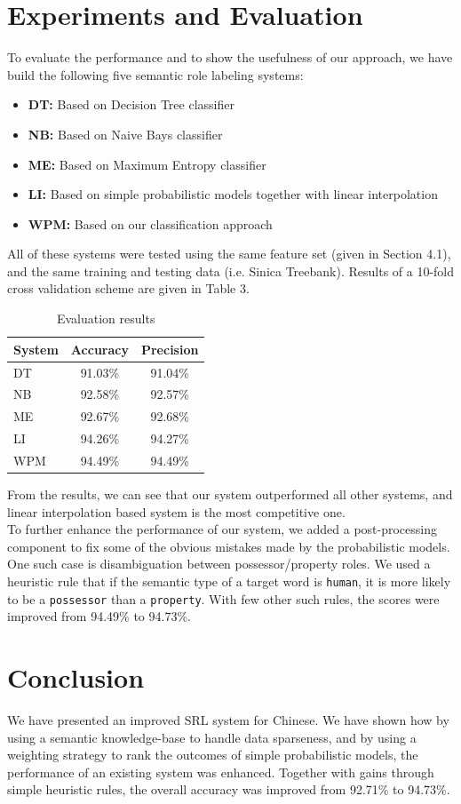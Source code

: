 \documentclass[11pt]{article}
\begin{document}
\section{Experiments and Evaluation}
To evaluate the performance and to show the usefulness of our approach, we have build the following five semantic role labeling systems:
\begin{itemize}
\item \textbf{DT:} Based on Decision Tree classifier
\item \textbf{NB:} Based on Naive Bays classifier
\item \textbf{ME:} Based on Maximum Entropy classifier
\item \textbf{LI:} Based on simple probabilistic models together with linear interpolation
\item \textbf{WPM:} Based on our classification approach
\end{itemize} 
All of these systems were tested using the same feature set (given in Section 4.1), and the same training and testing data (i.e. Sinica Treebank). Results of a 10-fold cross validation scheme are given in Table 3. 
\begin{table}[!h]
\begin{center}
\begin{tabular}{|l|c|c|}
\hline \bf System & \bf Accuracy &  \bf Precision\\ \hline
 DT & 91.03\% & 91.04\%  \\ 
 NB & 92.58\% & 92.57\% \\ 
 ME & 92.67\% & 92.68\% \\ 
 LI & 94.26\% &  94.27\%\\ 
 WPM & 94.49\% & 94.49\% \\ 
\hline 
\end{tabular}
\caption{Evaluation results} 
\end{center}
\end{table}
From the results, we can see that our system outperformed all other systems, and linear interpolation based system is the most competitive one. \\
To further enhance the performance of our system, we added a post-processing component to fix some of the obvious mistakes made by the probabilistic models. One such case is disambiguation between possessor/property roles. We used a heuristic rule that if the semantic type of a target word is \verb+human+, it is more likely to be a \verb+possessor+ than a \verb+property+. With few other such rules, the scores were improved from 94.49\% to 94.73\%. 

\section{Conclusion}
We have presented an improved SRL system for Chinese. We have shown how by using a semantic knowledge-base to handle data sparseness, and by using a weighting strategy to rank the outcomes of simple probabilistic models, the performance of an existing system was enhanced. Together with gains through simple heuristic rules, the overall accuracy was improved from 92.71\% to 94.73\%.
\clearpage


\end{document}
